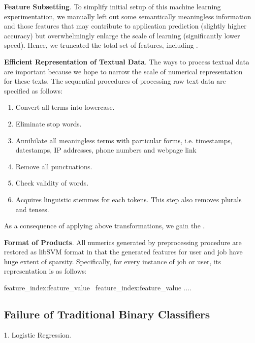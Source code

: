 \documentclass{article} %
\begin{document}
{\bf Feature Subsetting}.
To simplify initial setup of this machine learning experimentation, we
manually left out some semantically meaningless information and those features
that may contribute to application prediction (slightly higher accuracy) but
overwhelmingly enlarge the scale of learning (significantly lower speed).
Hence, we truncated the total set of features, including . 

{\bf Efficient Representation of Textual Data}.
The ways to process textual data are important because we hope to narrow the
scale of numerical representation for these texts.  The sequential procedures
of processing raw text data are specified as follows:
\begin{enumerate}[label=(\roman*)]
  \item{Convert all terms into lowercase.}
  \item{Eliminate stop words.}
  \item{Annihilate all meaningless terms with particular forms, i.e.
          timestamps, datestamps, IP addresses, phone numbers and webpage link}
  \item{Remove all punctuations.}
  \item{Check validity of words.}
  \item{Acquires linguistic stemmes for each tokens. This step also removes
          plurals and tenses.}
\end{enumerate}
As a consequence of applying above transformations, we gain the . 

{\bf Format of Products}.
All numerics generated by preprocessing procedure are restored as libSVM
format in that the generated features for user and job have huge extent of sparsity. 
Specifically, for every instance of job or user, its representation is as
follows:

\begin{center}
    feature\_index:feature\_value \ feature\_index:feature\_value .... 
\end{center}

\subsection{Failure of Traditional Binary Classifiers} %
1. Logistic Regression.
\end{document}
